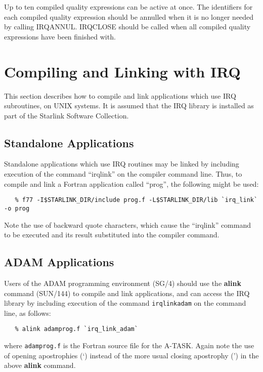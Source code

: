 \documentclass[twoside,11pt]{article}
\newcommand{\htmlref}[2]{#1}
\newcommand{\latex}[1]{#1}
\newcommand{\xref}[3]{#1}
\renewcommand{\_}{\texttt{\symbol{95}}}
\begin{document}
Up to ten compiled quality expressions can be active at once. The
identifiers for each compiled quality expression should be annulled
when it is no longer needed by calling
\htmlref{IRQ\_ANNUL}{IRQ_ANNUL}. \htmlref{IRQ\_CLOSE}{IRQ_CLOSE}
should be called when all compiled quality expressions have been
finished with. 

\section {Compiling and Linking with IRQ}
\label{SEC:LINK}
This section describes how to compile and link applications which use IRQ
subroutines, on UNIX systems. It is assumed that the IRQ library
is installed as part of the Starlink Software Collection.


\subsection{Standalone Applications}
Standalone applications which use IRQ\_ routines may be linked by
including execution of the command ``irq\_link'' on the compiler
command line. Thus, to compile and link a Fortran application called
``prog'', the following might be used:

\small
\begin{verbatim}
   % f77 -I$STARLINK_DIR/include prog.f -L$STARLINK_DIR/lib `irq_link` -o prog
\end{verbatim}
\normalsize

Note the use of backward quote characters, which cause the
``irq\_link'' command to be executed and its result substituted into
the compiler command.

\subsection{\label{ss:buildingadamapplications}ADAM Applications}
Users of the \xref{ADAM}{sg4}{} programming environment
\latex{(SG/4)} should use
the \xref{{\bf alink}}{sun144}{ADAM_link_scripts} command
(\xref{SUN/144}{sun144}{}) to compile and link applications, and can
access the IRQ\_ library by including execution of the command
{\tt irq\_link\_adam} on the command line, as follows:

\small
\begin{verbatim}
   % alink adamprog.f `irq_link_adam`
\end{verbatim}
\normalsize

where {\tt adamprog.f} is the Fortran source file for the A-TASK. Again
note the use of opening apostrophies (`) instead of the more usual
closing apostrophy (') in the above {\bf alink} command.
\end{document}
